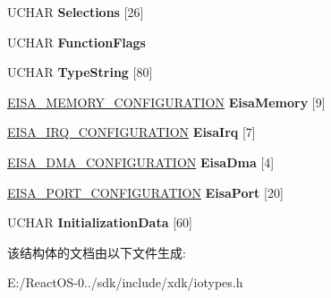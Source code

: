 \begin{DoxyCompactItemize}
U\+C\+H\+AR {\bfseries Selections} \mbox{[}26\mbox{]}
\item 
\mbox{\label{struct___c_m___e_i_s_a___f_u_n_c_t_i_o_n___i_n_f_o_r_m_a_t_i_o_n_a2aa5adf05bd624e697e615e0a448c92a}} 
U\+C\+H\+AR {\bfseries Function\+Flags}
\item 
\mbox{\label{struct___c_m___e_i_s_a___f_u_n_c_t_i_o_n___i_n_f_o_r_m_a_t_i_o_n_aa09d8062354c5cd0a5aff84e93ef17f0}} 
U\+C\+H\+AR {\bfseries Type\+String} \mbox{[}80\mbox{]}
\item 
\mbox{\label{struct___c_m___e_i_s_a___f_u_n_c_t_i_o_n___i_n_f_o_r_m_a_t_i_o_n_a4f2a52dcb9925ab31088e6e259f52516}} 
\hyperlink{struct___e_i_s_a___m_e_m_o_r_y___c_o_n_f_i_g_u_r_a_t_i_o_n}{E\+I\+S\+A\+\_\+\+M\+E\+M\+O\+R\+Y\+\_\+\+C\+O\+N\+F\+I\+G\+U\+R\+A\+T\+I\+ON} {\bfseries Eisa\+Memory} \mbox{[}9\mbox{]}
\item 
\mbox{\label{struct___c_m___e_i_s_a___f_u_n_c_t_i_o_n___i_n_f_o_r_m_a_t_i_o_n_a6fe8f47d8ab502d6cd2dc3ee0bb24a7f}} 
\hyperlink{struct___e_i_s_a___i_r_q___c_o_n_f_i_g_u_r_a_t_i_o_n}{E\+I\+S\+A\+\_\+\+I\+R\+Q\+\_\+\+C\+O\+N\+F\+I\+G\+U\+R\+A\+T\+I\+ON} {\bfseries Eisa\+Irq} \mbox{[}7\mbox{]}
\item 
\mbox{\label{struct___c_m___e_i_s_a___f_u_n_c_t_i_o_n___i_n_f_o_r_m_a_t_i_o_n_ace2aee5468ab09e8b91c296c0d306333}} 
\hyperlink{struct___e_i_s_a___d_m_a___c_o_n_f_i_g_u_r_a_t_i_o_n}{E\+I\+S\+A\+\_\+\+D\+M\+A\+\_\+\+C\+O\+N\+F\+I\+G\+U\+R\+A\+T\+I\+ON} {\bfseries Eisa\+Dma} \mbox{[}4\mbox{]}
\item 
\mbox{\label{struct___c_m___e_i_s_a___f_u_n_c_t_i_o_n___i_n_f_o_r_m_a_t_i_o_n_afe0b9c0a62d91d39b36fa1d7893b2e93}} 
\hyperlink{struct___e_i_s_a___p_o_r_t___c_o_n_f_i_g_u_r_a_t_i_o_n}{E\+I\+S\+A\+\_\+\+P\+O\+R\+T\+\_\+\+C\+O\+N\+F\+I\+G\+U\+R\+A\+T\+I\+ON} {\bfseries Eisa\+Port} \mbox{[}20\mbox{]}
\item 
\mbox{\label{struct___c_m___e_i_s_a___f_u_n_c_t_i_o_n___i_n_f_o_r_m_a_t_i_o_n_a7c593fda9326fa1c2e673a148203230d}} 
U\+C\+H\+AR {\bfseries Initialization\+Data} \mbox{[}60\mbox{]}
\end{DoxyCompactItemize}


该结构体的文档由以下文件生成\+:\begin{DoxyCompactItemize}
\item 
E\+:/\+React\+O\+S-\/0../sdk/include/xdk/iotypes.\+h\end{DoxyCompactItemize}
